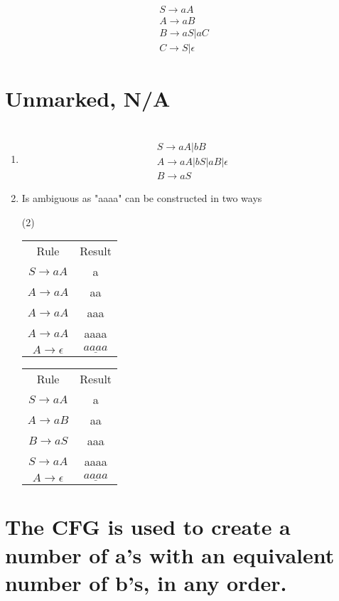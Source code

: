 \documentclass{article} %
\begin{document}
    \section{}
            \begin{gather*}
                S \to aA\\
                A \to aB\\
                B \to aS | aC\\
                C \to S | \epsilon
            \end{gather*}
    \section{Unmarked, N/A}
    \section{}
        \begin{enumerate}

            \item
            \begin{gather*}
                S \to aA | bB\\
                A \to aA | bS | aB | \epsilon\\
                B \to aS
            \end{gather*}
            \item Is ambiguous as "aaaa" can be constructed in two ways
            \begin{center}
                \begin{varwidth}{\textwidth}
                \begin{tasks}[label={(\Roman*)},label-width={1cm}] (2)
                    \task
                    \begin{tabular}{ c c}
                        Rule & Result\\
                        $S \to aA$ & a\\
                        $A \to aA$ & aa\\
                        $A \to aA$ & aaa\\
                        $A \to aA$ & aaaa\\
                        $A \to \epsilon$ & $\underline{aaaa}$
                    \end{tabular}

                    \task
                    \begin{tabular}{ c c}
                        Rule & Result\\
                        $S \to aA$ & a\\
                        $A \to aB$ & aa\\
                        $B \to aS$ & aaa\\
                        $S \to aA$ & aaaa\\
                        $A \to \epsilon$ & $\underline{aaaa}$
                    \end{tabular}
                \end{tasks}
                \end{varwidth}
            \end{center}
        \end{enumerate}
    \section{ The CFG is used to create a number of a's with an equivalent number of b's, in any order.}
\end{document}
